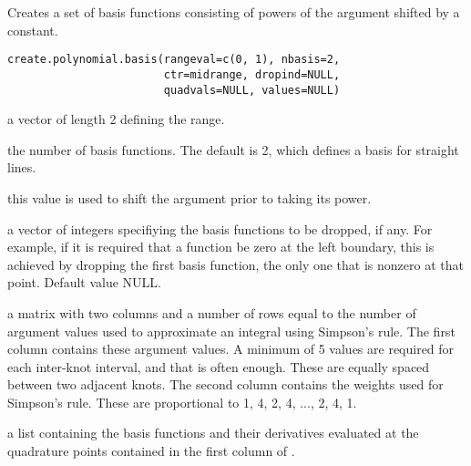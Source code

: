 \begin{Description}\relax
Creates a set of basis functions consisting of powers
of the argument shifted by a constant.
\end{Description}
\begin{Usage}
\begin{verbatim}
create.polynomial.basis(rangeval=c(0, 1), nbasis=2,
                        ctr=midrange, dropind=NULL,
                        quadvals=NULL, values=NULL)
\end{verbatim}
\end{Usage}
\begin{Arguments}
\begin{ldescription}
\item[\code{rangeval}] a vector of length 2 defining the range.

\item[\code{nbasis}] the number of basis functions. The default is 2,
which defines a basis for straight lines.

\item[\code{ctr}] this value is used to shift the argument prior to taking
its power.

\item[\code{dropind}] a vector of integers specifiying the basis functions to
be dropped, if any.  For example, if it is required that
a function be zero at the left boundary, this is achieved
by dropping the first basis function, the only one that
is nonzero at that point. Default value NULL.

\item[\code{quadvals}] a matrix with two columns and a number of rows equal to the number
of argument values used to approximate an integral using Simpson's
rule.  The first column contains these argument values.
A minimum of 5 values are required for
each inter-knot interval, and that is often enough. These
are equally spaced between two adjacent knots.
The second column contains the weights used for Simpson's
rule.  These are proportional to 1, 4, 2, 4, ..., 2, 4, 1.

\item[\code{values}] a list containing the basis functions and their derivatives
evaluated at the quadrature points contained in the first
column of .

\end{ldescription}
\end{Arguments}
